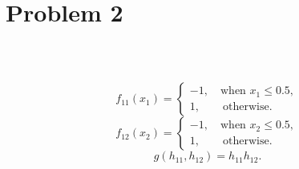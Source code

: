 \section{Problem 2}~\label{sec:prob2}

\subsection{} %

\begin{equation}
    f_{11}(x_1) = \begin{cases}
            -1, \quad \text{when }x_1\le 0.5, \\
            1, \quad\quad \text{otherwise}.
        \end{cases}
\end{equation}
\begin{equation}
    f_{12}(x_2) = \begin{cases}
            -1, \quad \text{when }x_2\le 0.5, \\
            1, \quad\quad \text{otherwise}.
        \end{cases}
\end{equation}
\begin{equation}
    g(h_{11}, h_{12}) = h_{11} h_{12}.
\end{equation}
